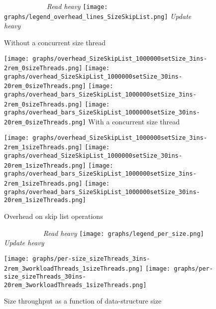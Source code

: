 \documentclass{article}
\begin{document}
\begin{figure*}[ht]
  \caption{Overhead on skip list operations}
  \centering
  \medskip
  \textit{\ \ \ \ \ \ \ \ \ \ \ \ Read heavy}\hfill
  \texttt{[image: graphs/legend\_overhead\_lines\_SizeSkipList.png]}\hfill
  \textit{Update heavy\ \ \ \ }\par
  \medskip
  Without a concurrent size thread\par
  \texttt{[image: graphs/overhead\_SizeSkipList\_1000000setSize\_3ins-2rem\_0sizeThreads.png]}\hspace*{1.5mm}
  \texttt{[image: graphs/overhead\_SizeSkipList\_1000000setSize\_30ins-20rem\_0sizeThreads.png]}
  {\texttt{[image: graphs/overhead\_bars\_SizeSkipList\_1000000setSize\_3ins-2rem\_0sizeThreads.png]}}\hspace*{0.5mm}
  \texttt{[image: graphs/overhead\_bars\_SizeSkipList\_1000000setSize\_30ins-20rem\_0sizeThreads.png]}
  \medskip
  With a concurrent size thread\par
  \texttt{[image: graphs/overhead\_SizeSkipList\_1000000setSize\_3ins-2rem\_1sizeThreads.png]}\hspace*{1mm}
  \texttt{[image: graphs/overhead\_SizeSkipList\_1000000setSize\_30ins-20rem\_1sizeThreads.png]}
  {\texttt{[image: graphs/overhead\_bars\_SizeSkipList\_1000000setSize\_3ins-2rem\_1sizeThreads.png]}}\hspace*{.05mm}
  \texttt{[image: graphs/overhead\_bars\_SizeSkipList\_1000000setSize\_30ins-20rem\_1sizeThreads.png]}
  \label{fig:SL overhead}
\end{figure*}

\begin{figure*}[ht]
  \caption{Size throughput as a function of data-structure size}
  \centering
  \medskip
  \textit{\ \ \ \ \ \ \ \ \ \ \ Read heavy}\hfill
  \texttt{[image: graphs/legend\_per\_size.png]}\hfill
  \textit{Update heavy\ \ \ }\par
  \medskip
  \texttt{[image: graphs/per-size\_sizeThreads\_3ins-2rem\_3workloadThreads\_1sizeThreads.png]}\hfill
  \texttt{[image: graphs/per-size\_sizeThreads\_30ins-20rem\_3workloadThreads\_1sizeThreads.png]}\par
  \label{fig:per-size}
\end{figure*}
\end{document}
